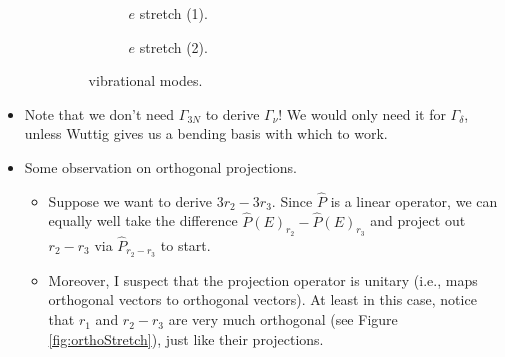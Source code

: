 \documentclass[../notes.tex]{subfiles}
\begin{document}
\begin{itemize}
\begin{itemize}
\begin{figure}[h!]
            \begin{subfigure}[b]{0.2\linewidth}
                \centering
                \caption{$e$ stretch (1).}
                \label{fig:PH3vibsb}
            \end{subfigure}
            \begin{subfigure}[b]{0.2\linewidth}
                \centering
                \caption{$e$ stretch (2).}
                \label{fig:PH3vibsc}
            \end{subfigure}
            \caption{ vibrational modes.}
            \label{fig:PH3vibs}
        \end{figure}
    \end{itemize}
    \item Note that we don't need $\Gamma_{3N}$ to derive $\Gamma_\nu$! We would only need it for $\Gamma_\delta$, unless Wuttig gives us a bending basis with which to work.
    \item Some observation on orthogonal projections.
    \begin{itemize}
        \item Suppose we want to derive $3r_2-3r_3$. Since $\hat{P}$ is a linear operator, we can equally well take the difference $\hat{P}(E)_{r_2}-\hat{P}(E)_{r_3}$ and project out $r_2-r_3$ via $\hat{P}_{r_2-r_3}$ to start.
        \item Moreover, I suspect that the projection operator is unitary (i.e., maps orthogonal vectors to orthogonal vectors). At least in this case, notice that $r_1$ and $r_2-r_3$ are very much orthogonal (see Figure \ref{fig:orthoStretch}), just like their projections.
        \begin{figure}[h!]
            \centering
            \footnotesize
\end{figure}
\end{itemize}
\end{itemize}
\end{document}
